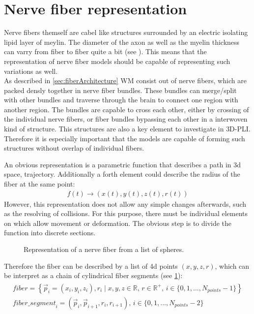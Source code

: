 \section{Nerve fiber representation}
\label{sec:nerve_fiber_representation}
%
Nerve fibers themself are cabel like structures surrounded by an electric isolating lipid layer of meylin.
The diameter of the axon as well as the myelin thickness can varry from fiber to fiber quite a bit (see \dummy{}).
This means that the representation of nerve fiber models should be capable of representing such variations as well.\\
%
As described in \cref{sec:fiberArchitecture} \ac{WM} consist out of nerve fibers, which are packed densly together in nerve fiber bundles.
These bundles can merge/split with other bundles and traverse through the brain to connect one region with another region.
The bundles are capable to cross each other, either by crossing of the individual nerve fibers, or fiber bundles bypassing each other in a interwoven kind of structure.
This structures are also a key element to investigate in \ac{3D-PLI}.
Therefore it is especially important that the models are capable of forming such structures without overlap of individual fibers.
\par
%
An obvious representation is a parametric function that describes a path in 3d space, \ie{} trajectory.
Additionally a forth element could describe the radius of the fiber at the same point:
\begin{align}
f(t) \rightarrow (x(t),y(t), z(t), r(t))
\end{align}
However, this representation does not allow any simple changes afterwards, such as the resolving of collisions.
For this purpose, there must be individual elements on which allow movement or deformation.
The obvious step is to divide the function into discrete sections.
%
\begin{figure}[!t]
    \setlength{\tikzwidth}{0.85\textwidth}
    \centering
	\caption[]{Representation of a nerve fiber from a list of spheres.}
	\label{fig:fiberReb}
\end{figure}
%
Therefore the fiber can be described by a list of 4d points $(x,y,z,r)$, which can be interpret as a chain of cylindrical fiber segments (see \cref{fig:fiberReb}):
\begin{align}
\begin{split}
\mathit{fiber} = \left\{ \vec{p}_i=(x_i,y_i,z_i), r_i \mid x,y,z \in \mathbb{R}, \, r \in \mathbb{R^+}, \, i \in \{0,1,...,N_{\mathit{points}}-1\}\right\} \\
\mathit{fiber\_segment}_i = (\vec{p}_i, \vec{p}_{i+1}, r_i, r_{i+1}), \, i \in \{0,1,...,N_{\mathit{points}}-2\}
\end{split}
\end{align}
